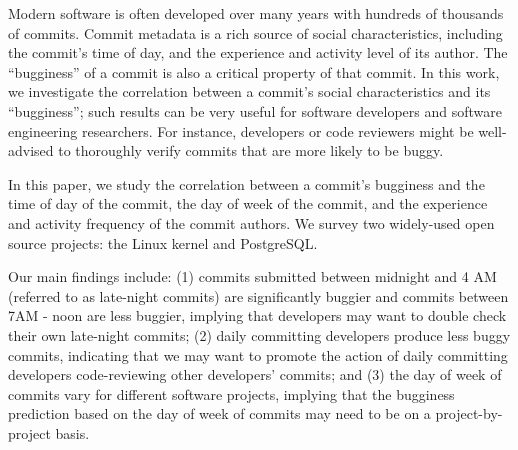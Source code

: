 Modern software is often developed over many years with hundreds of
thousands of commits. Commit metadata is a rich source of social
characteristics, including the commit's time of day, and the
experience and activity level of its author.  The ``bugginess'' of a
commit is also a critical property of that commit.  In this work, we
investigate the correlation between a commit's social characteristics
and its ``bugginess''; such results can be very useful for software
developers and software engineering researchers. For instance,
developers or code reviewers might be well-advised to thoroughly
verify commits that are more likely to be buggy.

In this paper, we study the correlation between a commit's bugginess
and the time of day of the commit, the day of week of the commit, and
the experience and activity frequency of the commit authors.  We
survey two widely-used open source projects: the Linux kernel and
PostgreSQL.  

Our main findings include: (1) commits submitted between midnight and
4 AM (referred to as late-night commits) are significantly buggier 
and commits between 7AM - noon are less buggier, implying that developers 
may want to double check their own late-night commits; 
(2) daily committing developers produce less buggy commits, indicating that we may 
want to promote the action of daily committing developers code-reviewing other 
developers' commits; and (3) 
the day of week of commits
vary for different software projects, implying that the bugginess prediction based on 
the day of week of commits may need to be on a project-by-project basis.



